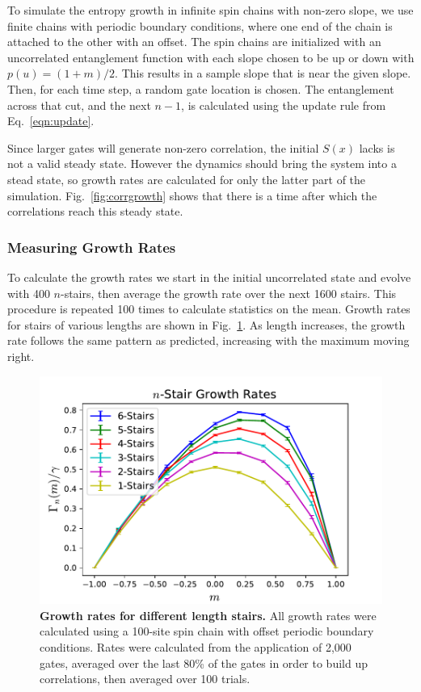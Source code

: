 To simulate the entropy growth in infinite spin chains with non-zero slope, we use finite chains with periodic boundary conditions, where one end of the chain is attached to the other with an offset. The spin chains are initialized with an uncorrelated entanglement function with each slope chosen to be up or down with $p(u)=(1+m)/2$. This results in a sample slope that is near the given slope. Then, for each time step, a random gate location is chosen. The entanglement across that cut, and the next $n-1$, is calculated using the update rule from Eq.~\ref{eqn:update}.

Since larger gates will generate non-zero correlation, the initial $S(x)$ lacks is not a valid steady state. However the dynamics should bring the system into a stead state, so growth rates are calculated for only the latter part of the simulation. Fig.~\ref{fig:corrgrowth} shows that there is a time after which the correlations reach this steady state.

\subsubsection{Measuring Growth Rates}  \label{subsub:growthrates}

To calculate the growth rates we start in the initial uncorrelated state and evolve with 400 $n$-stairs, then average the growth rate over the next 1600 stairs. This procedure is repeated 100 times to calculate statistics on the mean. Growth rates for stairs of various lengths are shown in Fig.~\ref{fig:compareRates}. As length increases, the growth rate follows the same pattern as predicted, increasing with the maximum moving right. 
\begin{figure}
	\centering
	\includegraphics[width=.5\textwidth]{compareRates.pdf}
	\caption{\textbf{Growth rates for different length stairs.} All growth rates were calculated using a 100-site spin chain with offset periodic boundary conditions. Rates were calculated from the application of 2,000 gates, averaged over the last 80\% of the gates in order to build up correlations, then averaged over 100 trials.}
	\label{fig:compareRates}
\end{figure}

